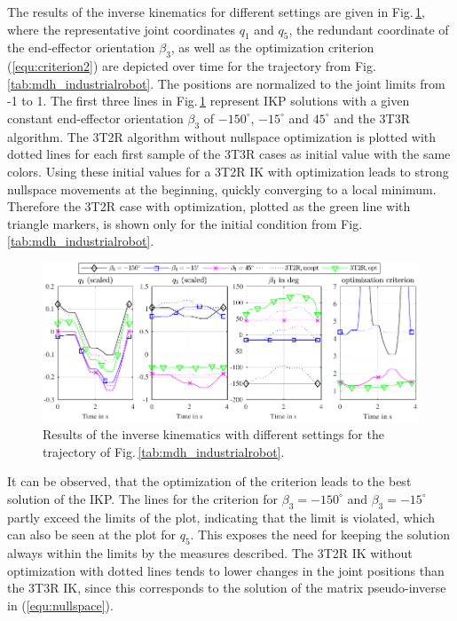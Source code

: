 \documentclass[robotics,article,submit,moreauthors,pdftex]{Definitions/mdpi}
\begin{document}
The results of the inverse kinematics for different settings are given in Fig.\,\ref{fig:serrob_traj_3T2R}, where the representative joint coordinates $q_1$ and $q_5$, the redundant coordinate of the end-effector orientation $\beta_3$, as well as the optimization criterion (\ref{equ:criterion2}) are depicted over time for the trajectory from Fig.\,\ref{tab:mdh_industrialrobot}.
The positions are normalized to the joint limits from -1 to 1.
The first three lines in Fig.\,\ref{fig:serrob_traj_3T2R} represent IKP solutions with a given constant end-effector orientation $\beta_3$ of $-150^\circ$, $-15^\circ$ and $45^\circ$ and the 3T3R algorithm.
The 3T2R algorithm without nullspace optimization is plotted with dotted lines for each first sample of the 3T3R cases as initial value with the same colors.
Using these initial values for a 3T2R IK with optimization leads to strong nullspace movements at the beginning, quickly converging to a local minimum.
Therefore\added[id=Sp]{,} the 3T2R case with optimization, plotted as the green line with triangle markers, is shown only for the initial condition from Fig.\,\ref{tab:mdh_industrialrobot}.
%
\begin{figure}[b]
	\includegraphics{serrob_traj_nullspace_optim.pdf}
	\caption{Results of the inverse kinematics with different settings for the trajectory of Fig.\,\ref{tab:mdh_industrialrobot}.}
	\label{fig:serrob_traj_3T2R}
\end{figure}
%
It can be observed, that the optimization of the criterion leads to the best solution of the IKP.
The lines for the criterion for $\beta_3=-150^\circ$ and $\beta_3=-15^\circ$ partly exceed the limits of the plot, indicating that the limit is violated, which can also be seen at the plot for $q_5$.
This exposes the need for keeping the solution always within the limits by the measures described.
The 3T2R IK without optimization with dotted lines tends to lower changes in the joint positions than the 3T3R IK, since this corresponds to the solution of the matrix pseudo-inverse in (\ref{equ:nullspace}).
\end{document}
